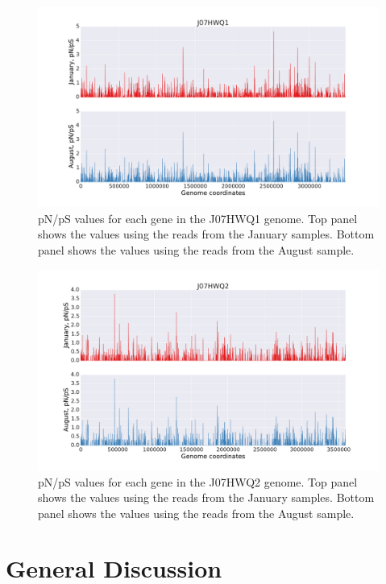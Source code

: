 \begin{figure}[p]
  \centering
  \includegraphics[width=\textwidth,height=\textheight,keepaspectratio]{Chapter5/Figures/pn_ps_plots/J07HWQ1_pNpS_density.pdf}
  \caption{pN/pS values for each gene in the J07HWQ1 genome. Top panel shows the values using the reads from the January samples. Bottom panel shows the values using the reads from the August sample.}
  \label{example_J07HWQ1_pNpS}
\end{figure}

\begin{figure}[p]
  \centering
  \includegraphics[width=\textwidth,height=\textheight,keepaspectratio]{Chapter5/Figures/pn_ps_plots/J07HWQ2_pNpS_density.pdf}
  \caption{pN/pS values for each gene in the J07HWQ2 genome. Top panel shows the values using the reads from the January samples. Bottom panel shows the values using the reads from the August sample.}
  \label{example_J07HWQ2_pNpS}
\end{figure}


\clearpage
\section{General Discussion}

